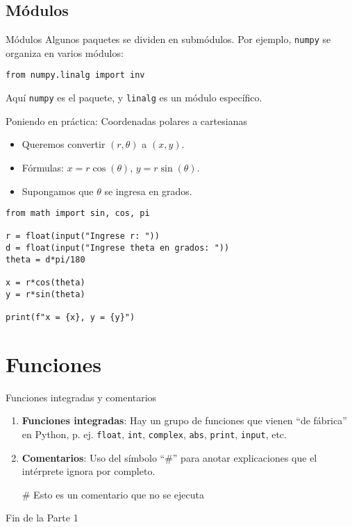 \documentclass[10pt]{beamer}
\begin{document}
\subsection{Módulos}
\begin{frame}[fragile]{Módulos}
Algunos paquetes se dividen en submódulos. Por ejemplo, \texttt{numpy} se organiza en varios módulos:
\begin{example}
\texttt{from numpy.linalg import inv}
\end{example}
Aquí \texttt{numpy} es el paquete, y \texttt{linalg} es un módulo específico.  
\end{frame}

\begin{frame}[fragile]{Poniendo en práctica: Coordenadas polares a cartesianas}
\begin{itemize}
    \item Queremos convertir \((r,\theta)\) a \((x,y)\).
    \item Fórmulas: \(x = r \cos(\theta)\), \(y = r \sin(\theta)\).
    \item Supongamos que \(\theta\) se ingresa en grados.
\end{itemize}
\begin{verbatim}
from math import sin, cos, pi

r = float(input("Ingrese r: "))
d = float(input("Ingrese theta en grados: "))
theta = d*pi/180

x = r*cos(theta)
y = r*sin(theta)

print(f"x = {x}, y = {y}")
\end{verbatim}
\end{frame}

\section{Funciones}
\begin{frame}[fragile]{Funciones integradas y comentarios}
\begin{enumerate}
	\item \textbf{Funciones integradas}:  
	Hay un grupo de funciones que vienen “de fábrica” en Python, p. ej. \texttt{float}, \texttt{int}, \texttt{complex}, \texttt{abs}, \texttt{print}, \texttt{input}, etc.
	\item \textbf{Comentarios}:  
	Uso del símbolo “\#” para anotar explicaciones que el intérprete ignora por completo.
	\begin{example}
\# Esto es un comentario que no se ejecuta
	\end{example}
\end{enumerate}
\end{frame}

\begin{frame}
\Huge{\centerline{Fin de la Parte 1}}
\end{frame}
\end{document}
